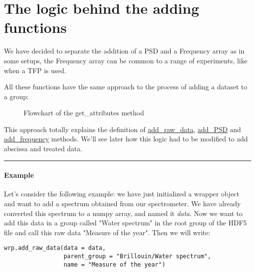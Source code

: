 \section{The logic behind the adding functions}
We have decided to separate the addition of a PSD and a Frequency array as in some setups, the Frequency array can be common to a range of experiments, like when a TFP is used.

All these functions have the same approach to the process of adding a dataset to a group:

\begin{figure}[H]
    \centering
    \label{fig:wrapper.flowchart_add_functions}
    \small
    \caption{Flowchart of the get\_attributes method}
\end{figure}

This approach totally explains the definition of \hyperref[subsec:wrapper.add_raw_data]{add\_raw\_data}, \hyperref[subsec:wrapper.add_psd]{add\_PSD} and \hyperref[subsec:wrapper.add_frequency]{add\_frequency} methods. We'll see later how this logic had to be modified to add abscissa and treated data.

\begin{center}
    \rule{15cm}{0.4pt}
\end{center}

\paragraph{Example}
Let's consider the following example: we have just initialized a wrapper object and want to add a spectrum obtained from our spectrometer. We have already converted this spectrum to a numpy array, and named it \textit{data}. Now we want to add this data in a group called "Water spectrum" in the root group of the HDF5 file and call this raw data "Measure of the year". Then we will write:
\begin{lstlisting}
wrp.add_raw_data(data = data,
                 parent_group = "Brillouin/Water spectrum", 
                 name = "Measure of the year")
\end{lstlisting}


